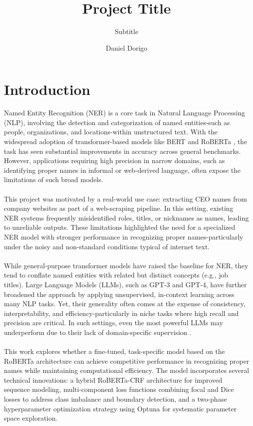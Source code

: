 \documentclass[a4paper]{usiinfbachelorproject}
\author{Daniel Dorigo }
\title{\textbf{Project Title}}
\subtitle{Subtitle}
\begin{document}
\maketitle
\tableofcontents\newpage

\section{\textbf{Introduction}}
Named Entity Recognition (NER) is a core task in Natural Language Processing (NLP), involving the detection and categorization of named entities-such as people, organizations, and locations-within unstructured text. With the widespread adoption of transformer-based models like BERT \cite{devlin-etal-2019-bert} and RoBERTa \cite{liu2019roberta}, the task has seen substantial improvements in accuracy across general benchmarks. However, applications requiring high precision in narrow domains, such as identifying proper names in informal or web-derived language, often expose the limitations of such broad models.
\\ \\
This project was motivated by a real-world use case: extracting CEO names from company websites as part of a web-scraping pipeline. In this setting, existing NER systems frequently misidentified roles, titles, or nicknames as names, leading to unreliable outputs. These limitations highlighted the need for a specialized NER model with stronger performance in recognizing proper names-particularly under the noisy and non-standard conditions typical of internet text.
\\ \\
While general-purpose transformer models have raised the baseline for NER, they tend to conflate named entities with related but distinct concepts (e.g., job titles). Large Language Models (LLMs), such as GPT-3\cite{brown2020languagemodelsfewshotlearners} and GPT-4, have further broadened the approach by applying unsupervised, in-context learning across many NLP tasks. Yet, their generality often comes at the expense of consistency, interpretability, and efficiency-particularly in niche tasks where high recall and precision are critical. In such settings, even the most powerful LLMs may underperform due to their lack of domain-specific supervision \cite{DBLP:journals/corr/abs-2304-10428}.
\\ \\ 
This work explores whether a fine-tuned, task-specific model based on the RoBERTa architecture can achieve competitive performance in recognizing proper names while maintaining computational efficiency. The model incorporates several technical innovations: a hybrid RoBERTa-CRF architecture for improved sequence modeling, multi-component loss functions combining focal and Dice losses to address class imbalance and boundary detection, and a two-phase hyperparameter optimization strategy using Optuna for systematic parameter space exploration.
\end{document}
